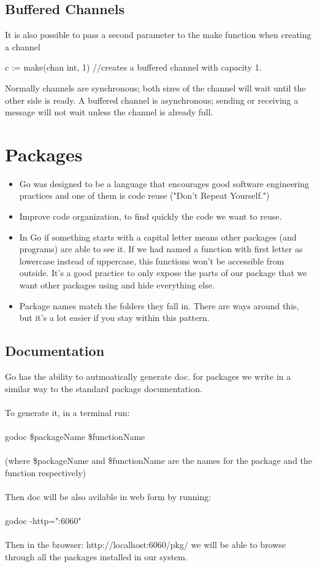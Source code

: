 \documentclass[twoside,a4paper,english]{report}
\begin{document}
\section{Buffered Channels}
It is also possible to pass a second parameter to the make function when creating a channel
\begin{go}
c := make(chan int, 1)  //creates a buffered channel with capacity 1. 
\end{go}
\vspace{0.7cm}
Normally channels are synchronous; both sizes of the channel will wait until the other side is ready. A buffered channel is asynchronous; sending or receiving a message will not wait unless the channel is already full.
\chapter{Packages}
\begin{itemize}
\item Go was designed to be a language that encourages good software engineering practices and one of them is code reuse ("Don't Repeat Yourself.")
\item Improve code organization, to find quickly the code we want to reuse.
\item In Go if something starts with a capital letter means other packages (and programs) are able to see it. If we had named a function with first letter as lowercase instead of uppercase, this functions won't be accessible from outside. It's a good practice to only expose the parts of our package that we want other packages using and hide everything else.
\item Package names match the folders they fall in. There are ways around this, but it's a lot easier if you stay within this pattern.
\end{itemize}
\section{Documentation}
Go has the ability to autmoatically generate doc. for packages we write in a similar way to the standard package documentation.\\\\
To generate it, in a terminal run:\\\\
godoc \$packageName \$functionName\\\\
(where \$packageName and \$functionName are the names for the package and the function respectively)\\\\
Then doc will be also avilable in web form by running:\\\\
godoc -http=":6060"\\\\
Then in the browser: http://localhost:6060/pkg/   we will be able to browse through all the packages installed in our system.
\end{document}
